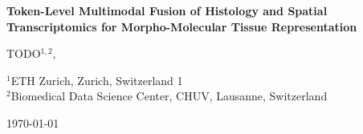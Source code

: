 \documentclass[11pt]{article}
\begin{document}
\begin{center}
  {\LARGE\bfseries Token-Level Multimodal Fusion of Histology and Spatial\\
  Transcriptomics for Morpho-Molecular Tissue Representation}

  \vspace{1em}

  {\large
    TODO$^{1,2}$,
  }

  \vspace{0.5em}

  {\small
    $^{1}$ETH Zurich, Zurich, Switzerland 1 \\
    $^{2}$Biomedical Data Science Center, CHUV, Lausanne, Switzerland
  }

  \vspace{0.5em}

  {\small \today}
\end{center}

\vspace{1em}



\vspace{1em}






\printbibliography

\appendix

\end{document}
